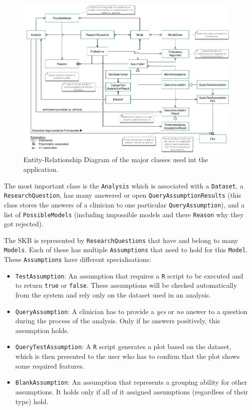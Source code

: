 \begin{figure}[!h]
	\centering
	\includegraphics[width=\textwidth]{figures/er_complete}
	\caption{Entity-Relationship Diagram of the major classes used int the application. }
	\label{fig:er}
\end{figure}


The most important class is the \texttt{Analysis} which is associated with a \texttt{Dataset}, a \texttt{ResearchQuestion}, has many answered or open \texttt{QueryAssumptionResults} (this class stores the answers of a clinician to one particular \texttt{QueryAssumption}), and a list of \texttt{PossibleModels} (including impossible models and there \texttt{Reason} why they got rejected). 

The \gls{SKB} is represented by \texttt{ResearchQuestions} that have and belong to many \texttt{Models}. Each of these has multiple \texttt{Assumptions} that need to hold for this \texttt{Model}. These \texttt{Assumptions} have different specialisations: 

\bigskip

\begin{itemize}

	\item \texttt{TestAssumption}: An assumption that requires a \texttt{R} script to be executed and to return \texttt{true} or \texttt{false}. These assumptions will be checked automatically from the system and rely only on the dataset used in an analysis.
	\item \texttt{QueryAssumption}: A clinician has to provide a \textit{yes} or \textit{no} answer to a question during the process of the analysis. Only if he answers positively, this assumption holds.
	\item \texttt{QueryTestAssumption}: A \texttt{R} script generates a plot based on the dataset, which is then presented to the user who has to confirm that the plot shows some required features.
	\item \texttt{BlankAssumption}: An assumption that represents a grouping ability for other assumptions. It holds only if all of it assigned assumptions (regardless of their type) hold. 
\end{itemize}
\bigskip


